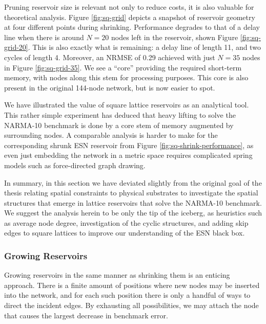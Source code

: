 Pruning reservoir size is relevant not only to reduce costs, it is also valuable
for theoretical analysis. Figure \ref{fig:sq-grid} depicts a snapshot of
reservoir geometry at four different points during shrinking. Performance
degrades to that of a delay line when there is around $N = 20$ nodes left in the
reservoir, shown Figure \ref{fig:sq-grid-20}. This is also exactly what is
remaining: a delay line of length 11, and two cycles of length 4. Moreover, an
NRMSE of 0.29 achieved with just $N = 35$ nodes in Figure
\ref{fig:sq-grid-35}. We see a ``core'' providing the required short-term
memory, with nodes along this stem for processing purposes. This core is also
present in the original 144-node network, but is now easier to spot.

We have illustrated the value of square lattice reservoirs as an analytical
tool. This rather simple experiment has deduced that heavy lifting to solve the
NARMA-10 benchmark is done by a core stem of memory augmented by surrounding
nodes. A comparable analysis is harder to make for the corresponding shrunk ESN
reservoir from Figure \ref{fig:sq-shrink-performance}, as even just embedding
the network in a metric space requires complicated spring models such as
force-directed graph drawing.

In summary, in this section we have deviated slightly from the original goal of
the thesis relating spatial constraints to physical substrates to investigate
the spatial structures that emerge in lattice reservoirs that solve the NARMA-10
benchmark. We suggest the analysis herein to be only the tip of the iceberg, as
heuristics such as average node degree, investigation of the cyclic structures,
and adding skip edges to square lattices to improve our understanding of the ESN
black box.

\subsubsection{Growing Reservoirs}

Growing reservoirs in the same manner as shrinking them is an enticing
approach. There is a finite amount of positions where new nodes may be inserted
into the network, and for each such position there is only a handful of ways to
direct the incident edges. By exhausting all possibilities, we may attach the
node that causes the largest decrease in benchmark error.

